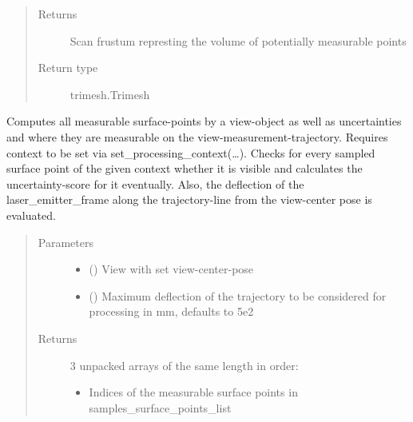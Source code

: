\documentclass[letterpaper,10pt,english]{sphinxmanual}
\begin{document}
\begin{fulllineitems}
\begin{fulllineitems}
\begin{quote}
\begin{description}
\item[{Returns}] \leavevmode
Scan frustum represting the volume of potentially measurable points

\item[{Return type}] \leavevmode
trimesh.Trimesh

\end{description}\end{quote}

\end{fulllineitems}


\begin{fulllineitems}
\label{\detokenize{module_sensor_model:agiprobot_measurement.sensor_model.SensorModel.process_view_metrologically}}
Computes all measurable surface-points by a view-object as well as uncertainties and where they are measurable on the view-measurement-trajectory.
Requires context to be set via set\_processing\_context(…). Checks for every sampled surface point of the given context whether it is visible and calculates the
uncertainty-score for it eventually. Also, the deflection of the laser\_emitter\_frame along the trajectory-line from the view-center pose is evaluated.
\begin{quote}\begin{description}
\item[{Parameters}] \leavevmode\begin{itemize}
\item {} 
 () \textendash{} View with set view-center-pose

\item {} 
 (\sphinxstyleliteralemphasis{, }) \textendash{} Maximum deflection of the trajectory to be considered for processing in mm, defaults to 5e2

\end{itemize}

\item[{Returns}] \leavevmode

3 unpacked arrays of the same length in order:
\begin{itemize}
\item {} 
Indices of the measurable surface points in samples\_surface\_points\_list


\end{itemize}
\end{description}
\end{quote}
\end{fulllineitems}
\end{fulllineitems}
\end{document}
